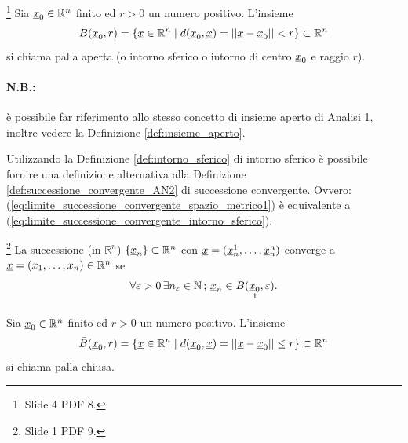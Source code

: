 \begin{definition}\label{def:intorno_sferico}\footnote{Slide 4 PDF 8.}
    Sia $\uline x_0\in\mathbb R^n$ finito ed $r>0$ un numero positivo. L'insieme
    \begin{equation}
        B(\uline x_0,r)=\{\uline x\in\mathbb R^n \;|\;d(\uline x_0, \uline x)=||\uline x-\uline x_0||<r\}\subset \mathbb R^n
    \end{equation}
    si chiama palla aperta (o intorno sferico o intorno di centro $\uline x_0$ e raggio $r$).
\end{definition}

\paragraph{N.B.:} è possibile far riferimento allo stesso concetto di insieme aperto di Analisi 1, inoltre vedere la Definizione \ref{def:insieme_aperto}.

Utilizzando la Definizione \ref{def:intorno_sferico} di intorno sferico è possibile fornire una definizione alternativa alla Definizione \ref{def:successione_convergente_AN2} di successione convergente. Ovvero: (\ref{eq:limite_successione_convergente_spazio_metrico1}) è equivalente a (\ref{eq:limite_successione_convergente_intorno_sferico}).

\begin{definition}\footnote{Slide 1 PDF 9.}
    La successione (in $\mathbb R^n$) $\{\uline x_n\}\subset\mathbb R^n$ con $\uline x=(\uline x_n^1,\hdots,\uline x_n^n)$ converge a $\uline x=(x_1,\hdots,x_n)\in\mathbb R^n$ se
    \begin{equation}\label{eq:limite_successione_convergente_intorno_sferico}
        \forall\varepsilon >0\, \exists n_\varepsilon\in\mathbb N\, ;\, \uline x_n\in \underset{\footnotemark}{B(\uline x_0,\varepsilon)}.
    \end{equation}
\end{definition}

\begin{definition}
    Sia $\uline x_0\in\mathbb R^n$ finito ed $r>0$ un numero positivo. L'insieme
    \begin{equation}
        \bar{B}(\uline x_0,r)=\{\uline x\in\mathbb R^n \;|\; d(\uline x_0, \uline x)=||\uline x-\uline x_0||\leq r\}\subset \mathbb R^n
    \end{equation}
    si chiama palla chiusa.
\end{definition}

